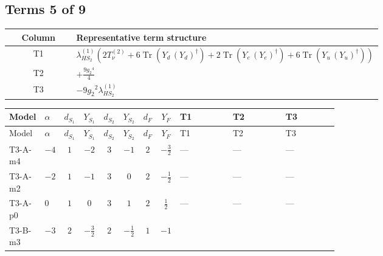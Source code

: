 \documentclass[8pt]{article}
\begin{document}
\begin{landscape}
\subsection*{Terms 5 of 9}
\begin{center}
\begin{tabular}{@{}c >{\raggedright\arraybackslash}p{0.82\linewidth}@{}}
\toprule
Column & Representative term structure \\
\midrule
T1 & \(\displaystyle {\lambda_{HS_2}^{(1)}} (2 T_{\nu}^{(2)}+6 \operatorname{Tr}\!\left({Y_d}\,\left({Y_d}\right)^{\dagger}\right)+2 \operatorname{Tr}\!\left({Y_e}\,\left({Y_e}\right)^{\dagger}\right)+6 \operatorname{Tr}\!\left({Y_u}\,\left({Y_u}\right)^{\dagger}\right))\) \\
\midrule
T2 & \(\displaystyle +\frac{9 {g_2}^4}{4}\) \\
\midrule
T3 & \(\displaystyle -9 {g_2}^2 {\lambda_{HS_2}^{(1)}}\) \\
\midrule
\bottomrule
\end{tabular}
\end{center}
\smallskip
\tiny
\begin{longtable}{@{}llcccccc >{\raggedright\arraybackslash}p{0.21\linewidth} >{\raggedright\arraybackslash}p{0.21\linewidth} >{\raggedright\arraybackslash}p{0.21\linewidth}@{}}
\toprule
Model & $\alpha$ & $d_{S_1}$ & $Y_{S_1}$ & $d_{S_2}$ & $Y_{S_2}$ & $d_F$ & $Y_F$ & T1 & T2 & T3 \\
\midrule
\endfirsthead
\toprule
Model & $\alpha$ & $d_{S_1}$ & $Y_{S_1}$ & $d_{S_2}$ & $Y_{S_2}$ & $d_F$ & $Y_F$ & T1 & T2 & T3 \\
\midrule
\endhead
T3-A-m4 & $-4$ & $1$ & $-2$ & $3$ & $-1$ & $2$ & $-\frac{3}{2}$ & --- & --- & --- \\
\midrule
T3-A-m2 & $-2$ & $1$ & $-1$ & $3$ & $0$ & $2$ & $-\frac{1}{2}$ & --- & --- & --- \\
\midrule
T3-A-p0 & $0$ & $1$ & $0$ & $3$ & $1$ & $2$ & $\frac{1}{2}$ & --- & --- & --- \\
\midrule
T3-B-m3 & $-3$ & $2$ & $-\frac{3}{2}$ & $2$ & $-\frac{1}{2}$ & $1$ & $-1$ & \scriptsize\adjustbox{max width=\linewidth}{$\begin{gathered} {\lambda_{HS_2}^{(1)}} (2 T_{\nu}^{(2)}+6 \operatorname{Tr}\!\left({Y_d}\,\left({Y_d}\right)^{\dagger}\right)+2 \operatorname{Tr}\!\left({Y_e}\,\left({Y_e}\right)^{\dagger}\right)+6 \operatorname{Tr}\!\left({Y_u}\,\left({Y_u}\right)^{\dagger}\right))\end{gathered}$} & \scriptsize\adjustbox{max width=\linewidth}{$\begin{gathered} +\frac{9 {g_2}^4}{4}\end{gathered}$} & \scriptsize\adjustbox{max width=\linewidth}{$\begin{gathered} -9 {g_2}^2 {\lambda_{HS_2}^{(1)}}\end{gathered}$} \\

\end{longtable}
\end{landscape}
\end{document}

